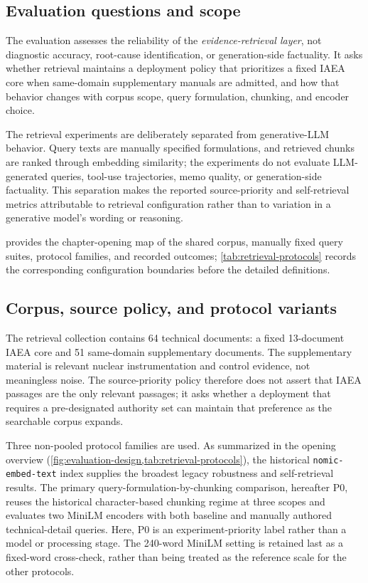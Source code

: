 \subsection{Evaluation questions and scope}
The evaluation assesses the reliability of the \emph{evidence-retrieval layer}, not diagnostic accuracy, root-cause identification, or generation-side factuality. It asks whether retrieval maintains a deployment policy that prioritizes a fixed IAEA core when same-domain supplementary manuals are admitted, and how that behavior changes with corpus scope, query formulation, chunking, and encoder choice.

The retrieval experiments are deliberately separated from generative-LLM behavior. Query texts are manually specified formulations, and retrieved chunks are ranked through embedding similarity; the experiments do not evaluate LLM-generated queries, tool-use trajectories, memo quality, or generation-side factuality. This separation makes the reported source-priority and self-retrieval metrics attributable to retrieval configuration rather than to variation in a generative model's wording or reasoning.

 provides the chapter-opening map of the shared corpus, manually fixed query suites, protocol families, and recorded outcomes; \cref{tab:retrieval-protocols} records the corresponding configuration boundaries before the detailed definitions.

\subsection{Corpus, source policy, and protocol variants}
The retrieval collection contains 64 technical documents: a fixed 13-document IAEA core and 51 same-domain supplementary documents. The supplementary material is relevant nuclear instrumentation and control evidence, not meaningless noise. The source-priority policy therefore does not assert that IAEA passages are the only relevant passages; it asks whether a deployment that requires a pre-designated authority set can maintain that preference as the searchable corpus expands.

Three non-pooled protocol families are used. As summarized in the opening overview (\cref{fig:evaluation-design,tab:retrieval-protocols}), the historical \texttt{nomic-embed-text} index supplies the broadest legacy robustness and self-retrieval results. The primary query-formulation-by-chunking comparison, hereafter P0, reuses the historical character-based chunking regime at three scopes and evaluates two MiniLM encoders with both baseline and manually authored technical-detail queries. Here, P0 is an experiment-priority label rather than a model or processing stage. The 240-word MiniLM setting is retained last as a fixed-word cross-check, rather than being treated as the reference scale for the other protocols.

